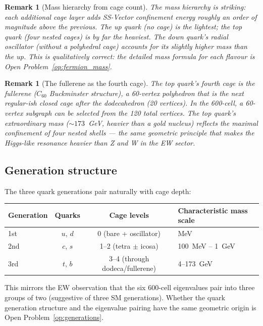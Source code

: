 \documentclass[11pt,a4paper]{article}
\newtheorem{remark}[theorem]{Remark}
\begin{document}
\begin{remark}[Mass hierarchy from cage count]
\label{rem:mass_hierarchy}
The mass hierarchy is striking: each additional cage layer adds
SS-Vector confinement energy roughly an order of magnitude above
the previous.  The up quark (no cage) is the lightest; the top
quark (four nested cages) is by far the heaviest.  The down quark's
radial oscillator (without a polyhedral cage) accounts for its
slightly higher mass than the up.  This is qualitatively correct:
the detailed mass formula for each flavour is Open
Problem~\ref{op:fermion_mass}.
\end{remark}

\begin{remark}[The fullerene as the fourth cage]
The top quark's fourth cage is the fullerene ($C_{60}$ Buckminster
structure), a 60-vertex polyhedron that is the next regular-ish
closed cage after the dodecahedron (20 vertices).  In the 600-cell,
a 60-vertex subgraph can be selected from the 120 total vertices.
The top quark's extraordinary mass ($\sim173$~GeV, heavier than a
gold nucleus) reflects the maximal confinement of four nested shells
--- the same geometric principle that makes the Higgs-like resonance
heavier than Z and W in the EW sector.
\end{remark}

\subsection{Generation structure}

The three quark generations pair naturally with cage depth:

\begin{center}
\begin{tabular}{@{}lccl@{}}
\toprule
Generation & Quarks & Cage levels & Characteristic mass scale \\
\midrule
1st & $u$, $d$ & 0 (bare + oscillator) & MeV \\
2nd & $c$, $s$ & 1--2 (tetra $\pm$ icosa) & 100~MeV -- 1~GeV \\
3rd & $t$, $b$ & 3--4 (through dodeca/fullerene) & 4--173~GeV \\
\bottomrule
\end{tabular}
\end{center}

This mirrors the EW observation that the six 600-cell eigenvalues
pair into three groups of two (suggestive of three SM generations).
Whether the quark generation structure and the eigenvalue pairing
have the same geometric origin is Open Problem~\ref{op:generations}.
\end{document}
